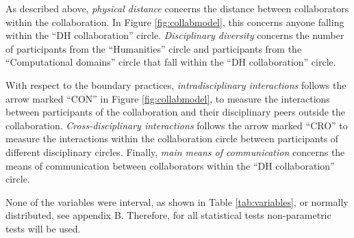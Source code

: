 \documentclass{article}
\begin{document}
As described above, \textit{physical distance} concerns the distance between collaborators within the collaboration. In Figure \ref{fig:collabmodel}, this concerns anyone falling within the ``DH collaboration'' circle. \textit{Disciplinary diversity} concerns the number of participants from the ``Humanities'' circle and participants from the ``Computational domains'' circle that fall within the ``DH collaboration'' circle. 

With respect to the boundary practices, \textit{intradisciplinary interactions} follows the arrow marked ``CON'' in Figure \ref{fig:collabmodel}, to measure the interactions between participants of the collaboration and their disciplinary peers outside the collaboration.
\textit{Cross-disciplinary interactions} follows the arrow marked ``CRO'' to measure the interactions within the collaboration circle between participants of different disciplinary circles. 
Finally, \textit{main means of communication} concerns the means of communication between collaborators within the ``DH collaboration'' circle.

None of the variables were interval, as shown in Table \ref{tab:variables}, or normally distributed, see appendix B. Therefore, for all statistical tests non-parametric tests will be used.
 
\begin{table}
\caption{Main variables for discussing the research question. The numbers in the column ``Question'' refer to the numbered questions in Appendix A.}
\label{tab:variables}
\end{table}
\end{document}

